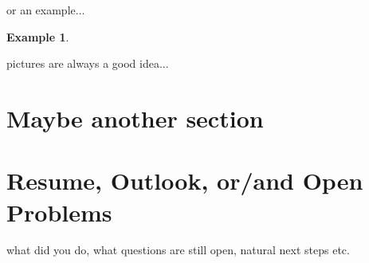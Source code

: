 \documentclass[12pt]{amsart}
\numberwithin{equation}{section}
\theoremstyle{definition}
\newtheorem{example}[thm]{Example}
\numberwithin{thm}{section}
\begin{document}
or an example...
\begin{example}

\end{example}

pictures are always a good idea...



\section{Maybe another section}


\section{Resume, Outlook, or/and Open Problems}
\label{Sec:Outlook}


what did you do, what questions are still open, natural next steps etc. 





\end{document}
